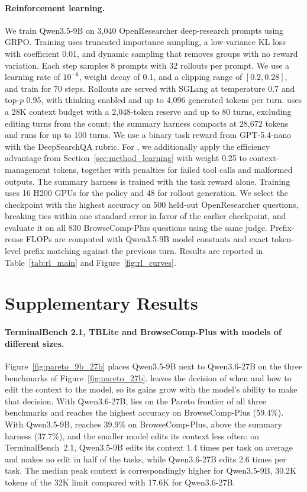 \paragraph{Reinforcement learning.}
We train Qwen3.5-9B on 3{,}040 OpenResearcher deep-research prompts using GRPO. Training uses truncated importance sampling, a low-variance KL loss with coefficient 0.01, and dynamic sampling that removes groups with no reward variation. Each step samples 8 prompts with 32 rollouts per prompt. We use a learning rate of \(10^{-6}\), weight decay of 0.1, and a clipping range of \([0.2, 0.28]\), and train for 70 steps. Rollouts are served with SGLang at temperature 0.7 and top-\(p\) 0.95, with thinking enabled and up to 4{,}096 generated tokens per turn. \ours{} uses a 28K context budget with a 2{,}048-token reserve and up to 80 turns, excluding editing turns from the count; the summary harness compacts at 28{,}672 tokens and runs for up to 100 turns.
We use a binary task reward from GPT-5.4-nano with the DeepSearchQA rubric. For \ours{}, we additionally apply the efficiency advantage from Section~\ref{sec:method_learning} with weight 0.25 to context-management tokens, together with penalties for failed tool calls and malformed outputs. The summary harness is trained with the task reward alone. Training uses 16 H200 GPUs for the policy and 48 for rollout generation. We select the checkpoint with the highest accuracy on 500 held-out OpenResearcher questions, breaking ties within one standard error in favor of the earlier checkpoint, and evaluate it on all 830 BrowseComp-Plus questions using the same judge. Prefix-reuse FLOPs are computed with Qwen3.5-9B model constants and exact token-level prefix matching against the previous turn. Results are reported in Table~\ref{tab:rl_main} and Figure~\ref{fig:rl_curves}.

\section{Supplementary Results}

\paragraph{TerminalBench 2.1, TBLite and BrowseComp-Plus with models of different sizes.}\label{app:full_results}
Figure~\ref{fig:pareto_9b_27b} places Qwen3.5-9B next to Qwen3.6-27B on the three benchmarks of Figure~\ref{fig:pareto_27b}. \ours{} leaves the decision of when and how to edit the context to the model, so its gains grow with the model's ability to make that decision. With Qwen3.6-27B, \ours{} lies on the Pareto frontier of all three benchmarks and reaches the highest accuracy on BrowseComp-Plus (59.4\%). With Qwen3.5-9B, \ours{} reaches 39.9\% on BrowseComp-Plus, above the summary harness (37.7\%), and the smaller model edits its context less often: on TerminalBench~2.1, Qwen3.5-9B edits its context 1.4 times per task on average and makes no edit in half of the tasks, while Qwen3.6-27B edits 2.6 times per task. The median peak context is correspondingly higher for Qwen3.5-9B, 30.2K tokens of the 32K limit compared with 17.6K for Qwen3.6-27B.

